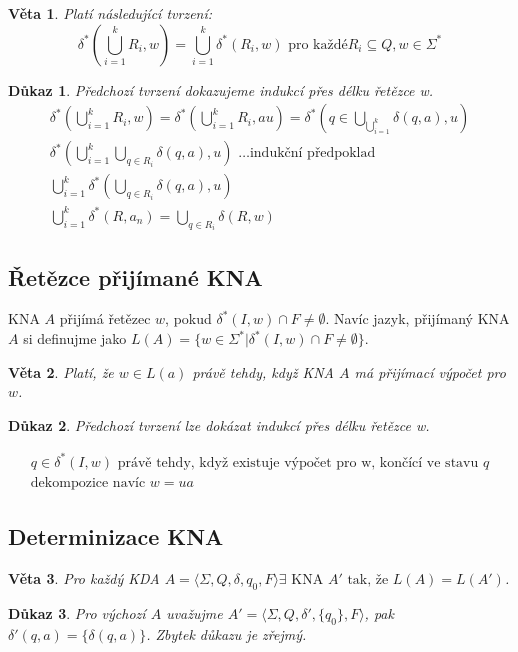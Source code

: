 \documentclass[10pt, a4paper, titlepage]{article}
\theoremstyle{note}
\newtheorem{dukaz}{Důkaz}
\newtheorem{veta}{Věta}
\begin{document}
\begin{veta}
Platí následující tvrzení:
$$
\delta^{*}(\bigcup\limits_{i=1}^{k} R_{i},w) = \bigcup\limits_{i=1}^{k} \delta^{*}(R_{i},w) \text{ pro každé} R_{i} \subseteq Q, w \in \Sigma^{*}
$$
\end{veta}
\begin{dukaz}
Předchozí tvrzení dokazujeme indukcí přes délku řetězce w.
\begin{gather*}
\delta^{*}(\bigcup\limits_{i=1}^{k}R_{i},w) = \delta^{*}(\bigcup\limits_{i=1}^{k}R_{i},au) = \delta^{*}(q \in \bigcup\limits_{\bigcup_{i=1}^{k}} \delta(q, a), u) \\
\delta^{*}(\bigcup\limits_{i=1}^{k}\bigcup\limits_{q \in R_{i}} \delta(q,a),u) \text{ \ldots indukční předpoklad} \\
\bigcup\limits_{i=1}^{k} \delta^{*}(\bigcup\limits_{q \in R_{i}} \delta(q,a),u) \\
\bigcup\limits_{i=1}^{k} \delta^{*}(R,a_{n}) = \bigcup\limits_{q \in R_{i}} \delta(R,w)
\end{gather*}
\end{dukaz}

\subsection{Řetězce přijímané KNA}
KNA $A$ přijímá řetězec $w$, pokud $\delta^{*}(I,w) \cap F \neq \emptyset$.
Navíc jazyk, přijímaný KNA $A$ si definujme jako $L(A) = \lbrace w \in \Sigma^{*} | \delta^{*}(I,w) \cap F \neq \emptyset \rbrace$.

\begin{veta}
Platí, že $w \in L(a)$ právě tehdy, když KNA $A$ má přijímací výpočet pro $w$.
\end{veta}
\begin{dukaz}
Předchozí tvrzení lze dokázat indukcí přes délku řetězce w.

\begin{gather*}
q \in \delta^{*}(I,w) \text{ právě tehdy, když existuje výpočet pro w, končící ve stavu } q \\
\text{dekompozice navíc } w = ua
\end{gather*}
\end{dukaz}

\subsection{Determinizace KNA}
\begin{veta}
Pro každý KDA $A=\langle \Sigma, Q, \delta, q_{0}, F \rangle \exists \text{ KNA } A' \text{ tak, že } L(A)=L(A') $.
\end{veta}
\begin{dukaz}
Pro výchozí $A$ uvažujme $A'= \langle \Sigma, Q, \delta', \lbrace q_{0} \rbrace , F \rangle$, pak $\delta'(q,a) = \lbrace \delta(q,a) \rbrace$. Zbytek důkazu je zřejmý.
\end{dukaz}
\end{document}
